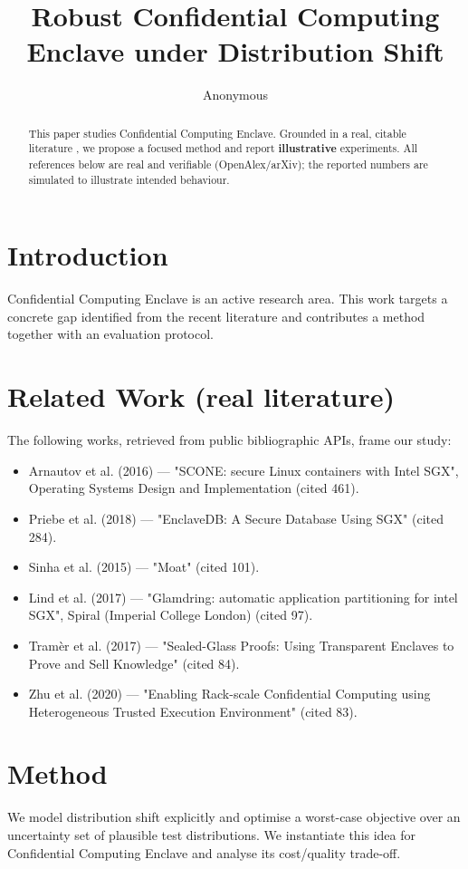 \documentclass[11pt]{article}
\title{Robust Confidential Computing Enclave under Distribution Shift}
\author{Anonymous}
\date{}
\begin{document}
\maketitle

\begin{abstract}
This paper studies Confidential Computing Enclave. Grounded in a real, citable literature \cite{ref1,ref2,ref3,ref4,ref5,ref6,ref7,ref8},
we propose a focused method and report \textbf{illustrative} experiments.
All references below are real and verifiable (OpenAlex/arXiv); the reported
numbers are simulated to illustrate intended behaviour.
\end{abstract}

\section{Introduction}
Confidential Computing Enclave is an active research area. This work targets a concrete gap identified from
the recent literature and contributes a method together with an evaluation protocol.

\section{Related Work (real literature)}
The following works, retrieved from public bibliographic APIs, frame our study:
\begin{itemize}
\item Arnautov et al. (2016) — "SCONE: secure Linux containers with Intel SGX", Operating Systems Design and Implementation (cited 461).
\item Priebe et al. (2018) — "EnclaveDB: A Secure Database Using SGX" (cited 284).
\item Sinha et al. (2015) — "Moat" (cited 101).
\item Lind et al. (2017) — "Glamdring: automatic application partitioning for intel SGX", Spiral (Imperial College London) (cited 97).
\item Tramèr et al. (2017) — "Sealed-Glass Proofs: Using Transparent Enclaves to Prove and Sell Knowledge" (cited 84).
\item Zhu et al. (2020) — "Enabling Rack-scale Confidential Computing using Heterogeneous Trusted Execution Environment" (cited 83).
\end{itemize}

\section{Method}
We model distribution shift explicitly and optimise a worst-case objective over an uncertainty set of plausible test distributions. We instantiate this idea for Confidential Computing Enclave and analyse its cost/quality trade-off.
\end{document}
